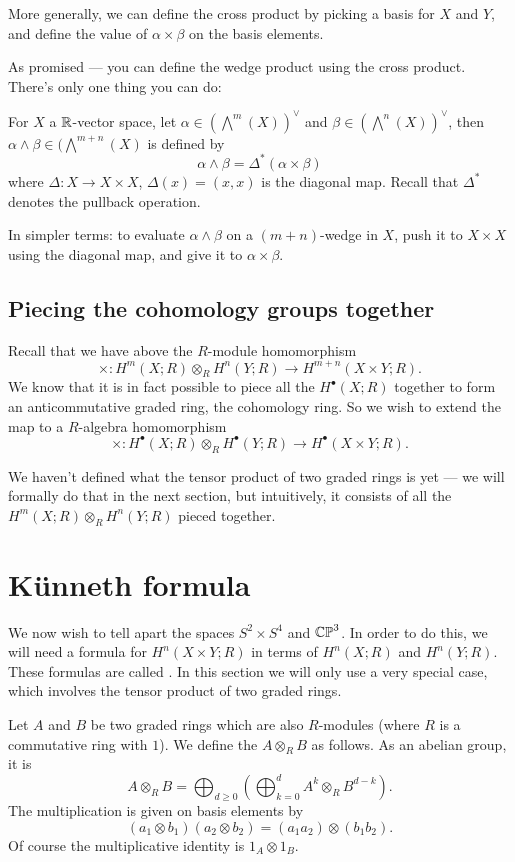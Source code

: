 More generally, we can define the cross product by picking a basis for $X$ and $Y$, and define the
value of $\alpha \times \beta$ on the basis elements.

As promised --- you can define the wedge product using the cross product.
There's only one thing you can do:
\begin{definition}
	For $X$ a $\mathbb R$-vector space,
	let $\alpha \in (\bigwedge^m(X))^\vee$ and $\beta \in (\bigwedge^n(X))^\vee$,
	then $\alpha \wedge \beta \in (\bigwedge^{m + n}(X)$ is defined by
	\[
		\alpha \wedge \beta = \Delta^*(\alpha \times \beta)
	\]
	where $\Delta \colon X \to X \times X$, $\Delta(x) = (x, x)$ is the diagonal map.
	Recall that $\Delta^*$ denotes the pullback operation.
\end{definition}
In simpler terms:
to evaluate $\alpha \wedge \beta$ on a $(m + n)$-wedge in $X$,
push it to $X \times X$ using the diagonal map, and give it to $\alpha \times \beta$.

\subsection{Piecing the cohomology groups together}

Recall that we have above the $R$-module homomorphism
\[ \times \colon H^m(X; R) \otimes_R H^n(Y; R) \to H^{m + n}(X \times Y; R). \]
We know that it is in fact possible to piece all the $H^\bullet(X; R)$ together to form
an anticommutative graded ring, the cohomology ring. So we wish to extend the map to a
$R$-algebra homomorphism
\[ \times \colon H^\bullet(X; R) \otimes_R H^\bullet(Y; R) \to H^\bullet(X \times Y; R). \]

We haven't defined what the tensor product of two graded rings is yet --- we will formally do that
in the next section, but intuitively, it consists of all the $H^m(X; R) \otimes_R H^n(Y; R)$
pieced together.

\section{K\"unneth formula}
We now wish to tell apart the spaces $S^2 \times S^4$ and $\mathbb{CP}^3$.
In order to do this, we will need a formula
for $H^n(X \times Y; R)$ in terms of $H^n(X;R)$ and $H^n(Y;R)$.
These formulas are called .
In this section we will only use a very special case,
which involves the tensor product of two graded rings.

\begin{definition}
	Let $A$ and $B$ be two graded rings which are also $R$-modules
	(where $R$ is a commutative ring with $1$).
	We define the  $A \otimes_R B$ as follows.
	As an abelian group, it is
	\[ A \otimes_R B = \bigoplus_{d \ge 0}
		\left( \bigoplus_{k=0}^{d} A^k \otimes_R B^{d-k}  \right). \]
	The multiplication is given on basis elements by
	\[ \left( a_1 \otimes b_1 \right)\left( a_2 \otimes b_2 \right)
		= (a_1a_2) \otimes (b_1b_2).
	\]
	Of course the multiplicative identity is $1_A \otimes 1_B$.
\end{definition}

